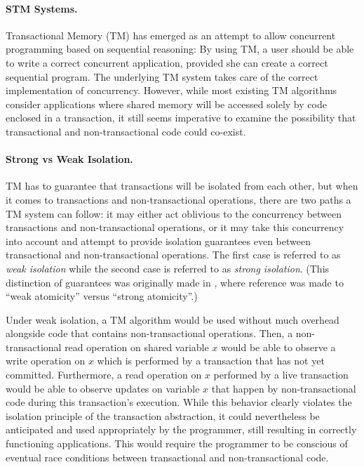 \documentclass[runningheads,a4paper]{llncs}
\begin{document}
\paragraph{STM Systems.}
Transactional Memory (TM) \cite{herlihy93} \cite{shavit95} has  emerged  as  an  attempt  to allow  concurrent  programming  based  
on sequential reasoning:  By  using  TM,  a  user  should  be able  to  write  a  correct  concurrent application, provided she can  
create a correct  sequential program. The underlying TM  system takes care of  the correct  implementation of  concurrency.  
However,  while most existing  TM algorithms consider applications  where  shared  memory  will  be  accessed  solely by  code  
enclosed  in  a transaction,  it still seems   imperative to  examine the  possibility that transactional and non-transactional code 
could co-exist. 



\paragraph{Strong vs Weak Isolation.}
TM has to guarantee that transactions will be isolated from each other, but
when it  comes to transactions and non-transactional  operations, there are
two  paths a  TM system  can follow:  it may  either act  oblivious  to the
concurrency between transactions and non-transactional 
operations, or  it may  take this concurrency  into account and  attempt to
provide     isolation    guarantees    even   between    transactional   and
non-transactional operations. The first  case is  referred to as \emph{weak
isolation} while the second case is referred to as \emph{strong  
isolation}.  (This  distinction  of   guarantees  was  originally  made  in
\cite{blundell06},  where   reference  was  made   to  {}``weak
atomicity'' versus {}``strong atomicity''.) 

Under weak  isolation, a  TM algorithm would  be used without  much overhead
alongside  code    that  contains  non-transactional  operations.  Then,  a
non-transactional read operation  on shared  variable $x$ would  be able to
observe a write operation on $x$ which is performed by a transaction  
that has not yet committed.  Furthermore, a read operation on $x$ performed
by a  live transaction  would  be able to  observe updates on  variable $x$
that   happen   by  non-transactional   code   during  this   transaction's
execution. While this behavior  clearly violates the isolation principle of
the  transaction abstraction, it could nevertheless be anticipated and used
appropriately by the  
programmer,  still resulting  in correctly  functioning  applications. This
would require the programmer 
to  be conscious  of  eventual race  conditions  between transactional  and
non-transactional code.  
\end{document}
